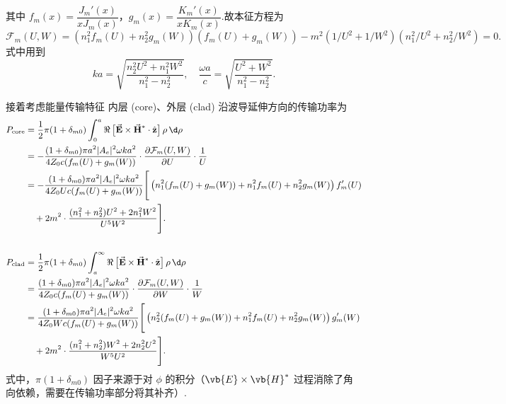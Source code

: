其中 \( f_m(x) = \dfrac{J_m'(x)}{x J_m(x)} \)，\( g_m(x) = \dfrac{K_m'(x)}{x K_m(x)} \).故本征方程为
\begin{equation*}
	\mathcal{F}_m(U, W) = \left( n_1^2 f_m(U) + n_2^2 g_m(W) \right) \left( f_m(U) + g_m(W) \right) - m^2 \left( 1/U^2 + 1/W^2 \right) \left( n_1^2/U^2 + n_2^2/W^2 \right) = 0.
\end{equation*}
式中用到
\begin{equation*}
	ka = \sqrt{\dfrac{n_2^2 U^2 + n_1^2 W^2}{n_1^2 - n_2^2}}, \quad \dfrac{\omega a}{c} = \sqrt{\dfrac{U^2 + W^2}{n_1^2 - n_2^2}}.
\end{equation*}

接着考虑能量传输特征
内层 (core)、外层 (clad) 沿波导延伸方向的传输功率为
\begin{equation*}
	\small
	\begin{split}
		P_{\text{core}} & = \frac{1}{2} \pi (1 + \delta_{m0}) \int_0^a \Re\left[ \vec{\mathbf{E}} \times \vec{\mathbf{H}}^* \cdot \hat{\mathbf{z}} \right] \rho \, \d \rho                          \\
		                & = -\frac{(1 + \delta_{m0}) \pi a^2 |A_e|^2 \omega k a^2}{4 Z_0 c (f_m(U) + g_m(W))} \cdot \frac{\partial \mathcal{F}_m(U, W)}{\partial U} \cdot \frac{1}{U}               \\
		                & = -\frac{(1 + \delta_{m0}) \pi a^2 |A_e|^2 \omega k a^2}{4 Z_0 U c (f_m(U) + g_m(W))} \Bigg[ \left( n_1^2 (f_m(U) + g_m(W)) + n_1^2 f_m(U) + n_2^2 g_m(W) \right) f_m'(U) \\
		                & \quad + 2 m^2 \cdot \frac{(n_1^2 + n_2^2) U^2 + 2 n_1^2 W^2}{U^5 W^2} \Bigg].                                                                                             \\
		\\
		P_{\text{clad}} & = \frac{1}{2} \pi (1 + \delta_{m0}) \int_a^\infty \Re\left[ \vec{\mathbf{E}} \times \vec{\mathbf{H}}^* \cdot \hat{\mathbf{z}} \right] \rho \, \d \rho                     \\
		                & = \frac{(1 + \delta_{m0}) \pi a^2 |A_e|^2 \omega k a^2}{4 Z_0 c (f_m(U) + g_m(W))} \cdot \frac{\partial \mathcal{F}_m(U, W)}{\partial W} \cdot \frac{1}{W}                \\
		                & = \frac{(1 + \delta_{m0}) \pi a^2 |A_e|^2 \omega k a^2}{4 Z_0 W c (f_m(U) + g_m(W))} \Bigg[ \left( n_2^2 (f_m(U) + g_m(W)) + n_1^2 f_m(U) + n_2^2 g_m(W) \right)g_m'(W)   \\
		                & \quad + 2 m^2 \cdot \frac{(n_1^2 + n_2^2) W^2 + 2 n_2^2 U^2}{W^5 U^2} \Bigg].
	\end{split}
	\normalsize
\end{equation*}
式中，\(\pi (1 + \delta_{m0})\) 因子来源于对 \(\phi\) 的积分（\(\vb{E} \times \vb{H}^*\) 过程消除了角向依赖，需要在传输功率部分将其补齐）.

